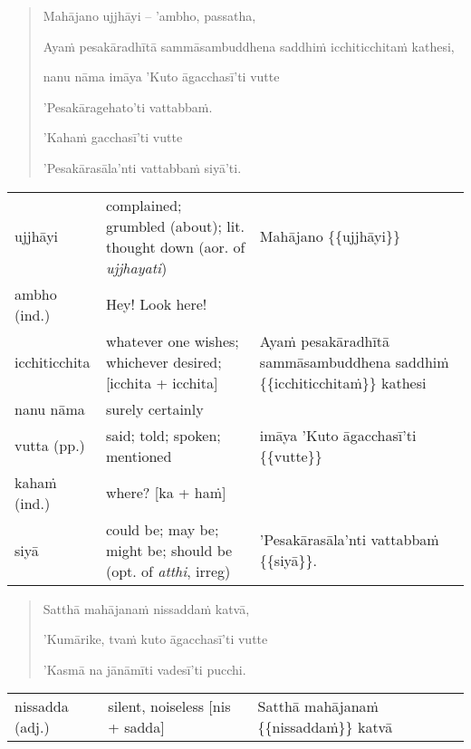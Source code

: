 \documentclass[11pt,oneside]{memoir}
\begin{document}
\clearpage

\begin{quote}
Mahājano ujjhāyi -- 'ambho, passatha,

Ayaṁ pesakāradhītā sammāsambuddhena saddhiṁ icchiticchitaṁ kathesi,

nanu nāma imāya 'Kuto āgacchasī'ti vutte

'Pesakāragehato'ti vattabbaṁ.

'Kahaṁ gacchasī'ti vutte

'Pesakārasāla'nti vattabbaṁ siyā'ti.
\end{quote}

\begin{longtable}{L{\colOne} L{\colTwo} H}
ujjhāyi & complained; grumbled (about); lit. thought down (aor. of \emph{ujjhayati}) & Mahājano \{\{ujjhāyi\}\}\\[0pt]
ambho (ind.) & Hey! Look here! & \\[0pt]
icchiticchita & whatever one wishes; whichever desired; [icchita + icchita] & Ayaṁ pesakāradhītā sammāsambuddhena saddhiṁ \{\{icchiticchitaṁ\}\} kathesi\\[0pt]
nanu nāma & surely certainly & \\[0pt]
vutta (pp.) & said; told; spoken; mentioned & imāya 'Kuto āgacchasī'ti \{\{vutte\}\}\\[0pt]
kahaṁ (ind.) & where? [ka + haṁ] & \\[0pt]
siyā & could be; may be; might be; should be (opt. of \emph{atthi}, irreg) & 'Pesakārasāla'nti vattabbaṁ \{\{siyā\}\}.\\[0pt]
\end{longtable}


\clearpage

\begin{quote}
Satthā mahājanaṁ nissaddaṁ katvā,

'Kumārike, tvaṁ kuto āgacchasī'ti vutte

'Kasmā na jānāmīti vadesī'ti pucchi.
\end{quote}

\begin{longtable}{L{\colOne} L{\colTwo} H}
nissadda (adj.) & silent, noiseless [nis + sadda] & Satthā mahājanaṁ \{\{nissaddaṁ\}\} katvā\\[0pt]
\end{longtable}

\end{document}
